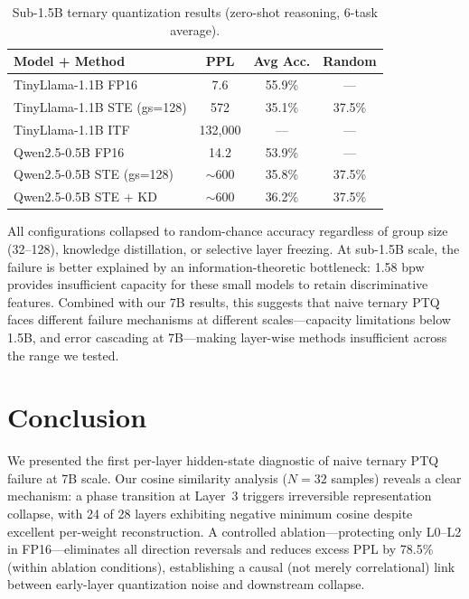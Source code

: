 \documentclass[10pt,a4paper]{article}
\begin{document}
\begin{table}[htbp]
\centering
\caption{Sub-1.5B ternary quantization results (zero-shot reasoning, 6-task average).}
\label{tab:small}
\begin{tabular}{lccc}
\toprule
\textbf{Model + Method} & \textbf{PPL} & \textbf{Avg Acc.} & \textbf{Random} \\
\midrule
TinyLlama-1.1B FP16 & 7.6 & 55.9\% & --- \\
TinyLlama-1.1B STE (gs=128) & 572 & 35.1\% & 37.5\% \\
TinyLlama-1.1B ITF & 132,000 & --- & --- \\
\midrule
Qwen2.5-0.5B FP16 & 14.2 & 53.9\% & --- \\
Qwen2.5-0.5B STE (gs=128) & $\sim$600 & 35.8\% & 37.5\% \\
Qwen2.5-0.5B STE + KD & $\sim$600 & 36.2\% & 37.5\% \\
\bottomrule
\end{tabular}
\end{table}

All configurations collapsed to random-chance accuracy regardless of group size (32--128), knowledge distillation, or selective layer freezing.
At sub-1.5B scale, the failure is better explained by an information-theoretic bottleneck: 1.58 bpw provides insufficient capacity for these small models to retain discriminative features.
Combined with our 7B results, this suggests that naive ternary PTQ faces different failure mechanisms at different scales---capacity limitations below 1.5B, and error cascading at 7B---making layer-wise methods insufficient across the range we tested.

\section{Conclusion}
\label{sec:conclusion}

We presented the first per-layer hidden-state diagnostic of naive ternary PTQ failure at 7B scale.
Our cosine similarity analysis ($N{=}32$ samples) reveals a clear mechanism: a phase transition at Layer~3 triggers irreversible representation collapse, with 24 of 28 layers exhibiting negative minimum cosine despite excellent per-weight reconstruction.
A controlled ablation---protecting only L0--L2 in FP16---eliminates all direction reversals and reduces excess PPL by 78.5\% (within ablation conditions), establishing a causal (not merely correlational) link between early-layer quantization noise and downstream collapse.
\end{document}
